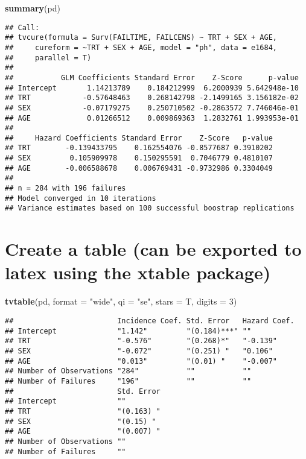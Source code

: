 \documentclass[]{article}
\newenvironment{Shaded}{\begin{snugshade}}{\end{snugshade}}
\newcommand{\DataTypeTok}[1]{\textcolor[rgb]{0.13,0.29,0.53}{#1}}
\newcommand{\DecValTok}[1]{\textcolor[rgb]{0.00,0.00,0.81}{#1}}
\newcommand{\KeywordTok}[1]{\textcolor[rgb]{0.13,0.29,0.53}{\textbf{#1}}}
\newcommand{\NormalTok}[1]{#1}
\newcommand{\StringTok}[1]{\textcolor[rgb]{0.31,0.60,0.02}{#1}}
\begin{document}
\begin{Shaded}
\begin{Highlighting}[]
\KeywordTok{summary}\NormalTok{(pd)}
\end{Highlighting}
\end{Shaded}

\begin{verbatim}
## Call:
## tvcure(formula = Surv(FAILTIME, FAILCENS) ~ TRT + SEX + AGE, 
##     cureform = ~TRT + SEX + AGE, model = "ph", data = e1684, 
##     parallel = T)
## 
##           GLM Coefficients Standard Error    Z-Score      p-value
## Intercept       1.14213789    0.184212999  6.2000939 5.642948e-10
## TRT            -0.57648463    0.268142798 -2.1499165 3.156182e-02
## SEX            -0.07179275    0.250710502 -0.2863572 7.746046e-01
## AGE             0.01266512    0.009869363  1.2832761 1.993953e-01
## 
##     Hazard Coefficients Standard Error    Z-Score   p-value
## TRT        -0.139433795    0.162554076 -0.8577687 0.3910202
## SEX         0.105909978    0.150295591  0.7046779 0.4810107
## AGE        -0.006588678    0.006769431 -0.9732986 0.3304049
## 
## n = 284 with 196 failures
## Model converged in 10 iterations
## Variance estimates based on 100 successful boostrap replications
\end{verbatim}

\hypertarget{create-a-table-can-be-exported-to-latex-using-the-xtable-package}{%
\section{Create a table (can be exported to latex using the xtable
package)}\label{create-a-table-can-be-exported-to-latex-using-the-xtable-package}}

\begin{Shaded}
\begin{Highlighting}[]
\KeywordTok{tvtable}\NormalTok{(pd, }\DataTypeTok{format =} \StringTok{"wide"}\NormalTok{, }\DataTypeTok{qi =} \StringTok{"se"}\NormalTok{, }\DataTypeTok{stars =}\NormalTok{ T, }\DataTypeTok{digits =} \DecValTok{3}\NormalTok{)}
\end{Highlighting}
\end{Shaded}

\begin{verbatim}
##                        Incidence Coef. Std. Error   Hazard Coef.
## Intercept              "1.142"         "(0.184)***" ""          
## TRT                    "-0.576"        "(0.268)*"   "-0.139"    
## SEX                    "-0.072"        "(0.251) "   "0.106"     
## AGE                    "0.013"         "(0.01) "    "-0.007"    
## Number of Observations "284"           ""           ""          
## Number of Failures     "196"           ""           ""          
##                        Std. Error
## Intercept              ""        
## TRT                    "(0.163) "
## SEX                    "(0.15) " 
## AGE                    "(0.007) "
## Number of Observations ""        
## Number of Failures     ""
\end{verbatim}
\end{document}
